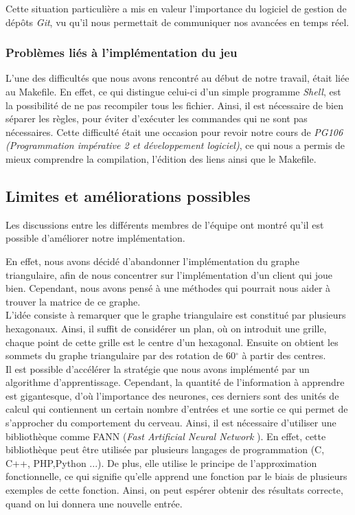 \documentclass[a4paper,10pt]{article}
\begin{document}
Cette situation particulière a mis en valeur l'importance du logiciel de gestion de dépôts \textit{Git}, vu qu'il nous permettait de communiquer nos avancées en temps réel.

\subsubsection{Problèmes liés à l'implémentation du jeu}

L'une des difficultés que nous avons rencontré au début de notre travail, était liée au Makefile. En effet, ce qui distingue celui-ci d'un simple programme \textit{Shell}, est la possibilité de ne pas recompiler tous les fichier. Ainsi, il est nécessaire de bien séparer les règles, pour éviter d'exécuter les commandes qui ne sont pas nécessaires. Cette difficulté était une occasion pour revoir notre cours de \textit{PG106 (Programmation impérative 2 et développement logiciel)}, ce qui nous a permis de mieux comprendre la compilation, l'édition des liens ainsi que le Makefile.



\subsection{Limites et améliorations possibles}
Les discussions entre les différents membres de l'équipe ont montré qu'il est possible d'améliorer notre implémentation.
\newline

En effet, nous avons décidé d'abandonner l'implémentation du graphe triangulaire, afin de nous concentrer sur l'implémentation d'un client qui joue bien. Cependant, nous avons pensé à une méthodes qui pourrait nous aider à trouver la matrice de ce graphe.\\ 


L'idée consiste à remarquer que le graphe triangulaire est constitué par plusieurs hexagonaux. Ainsi, il suffit de considérer un plan, où on introduit une grille, chaque point de cette grille est le centre d'un hexagonal. Ensuite on obtient les sommets du graphe triangulaire par des rotation de 60$^{\circ}$ à partir des centres. \\

Il est possible d'accélérer la stratégie que nous avons implémenté par un algorithme d'apprentissage. Cependant, la quantité de l'information à apprendre est gigantesque, d'où l'importance des neurones, ces derniers sont des unités de calcul qui contiennent un certain nombre d'entrées et une sortie ce qui permet de s'approcher du comportement du cerveau. Ainsi, il est nécessaire d'utiliser une bibliothèque comme FANN (\textit{Fast Artificial Neural Network }). En effet, cette bibliothèque peut être utilisée par plusieurs langages de programmation (C, C++, PHP,Python ...). De plus, elle utilise le principe de l'approximation fonctionnelle, ce qui signifie qu'elle apprend une fonction par le biais de plusieurs exemples de cette fonction. Ainsi, on peut espérer obtenir des résultats correcte, quand on lui donnera une nouvelle entrée. \\
\end{document}

